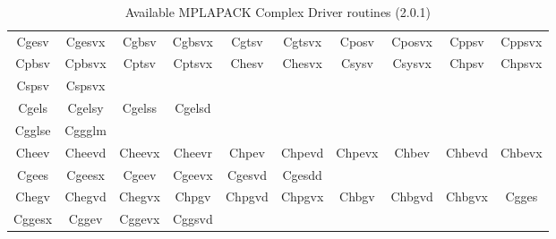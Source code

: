 \documentclass[12pt]{article}
\begin{document}
\begin{table}
\caption{Available MPLAPACK Complex Driver routines (2.0.1)}\label{mplapackdriver_complex}
\begin{center}
{\tt
\begin{tabular}{cccccccccc} \hline
Cgesv & Cgesvx & Cgbsv & Cgbsvx & Cgtsv & Cgtsvx & Cposv & Cposvx & Cppsv & Cppsvx \\
Cpbsv & Cpbsvx & Cptsv & Cptsvx & Chesv & Chesvx & Csysv & Csysvx & Chpsv & Chpsvx \\
Cspsv & Cspsvx \\ \hline %
Cgels & Cgelsy & Cgelss & Cgelsd  \\ \hline %
Cgglse & Cggglm \\ \hline %
Cheev & Cheevd & Cheevx & Cheevr & Chpev & Chpevd & Chpevx & Chbev & Chbevd & Chbevx \\
Cgees & Cgeesx & Cgeev & Cgeevx & Cgesvd & Cgesdd \\ \hline %
Chegv & Chegvd & Chegvx & Chpgv & Chpgvd & Chpgvx & Chbgv & Chbgvd & Chbgvx & Cgges \\ %
Cggesx & Cggev & Cggevx & Cggsvd \\ \hline
\end{tabular}
}
\end{center}
\end{table}
\end{document}
